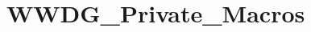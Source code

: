 \hypertarget{group___w_w_d_g___private___macros}{\section{W\-W\-D\-G\-\_\-\-Private\-\_\-\-Macros}
\label{group___w_w_d_g___private___macros}
}
